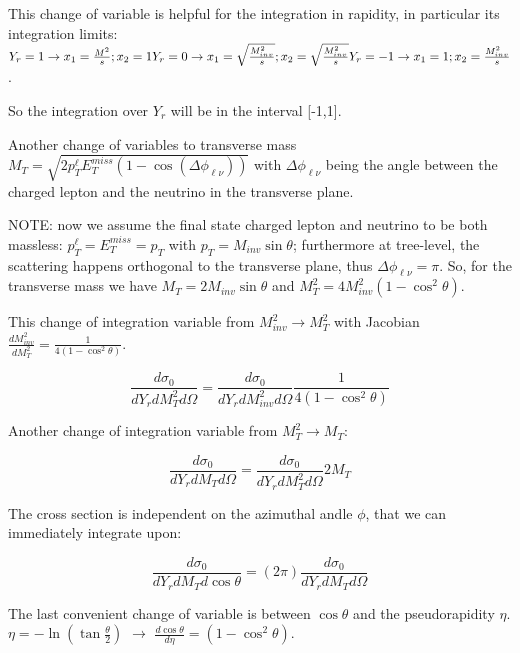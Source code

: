 \documentclass{article}
\begin{document}
This change of variable is helpful for the integration in rapidity, in particular its integration limits: \\
$Y_r = 1 \to x_1 = \frac{M^2}{s}; x_2 = 1\\
Y_r = 0 \to x_1 = \sqrt{\frac{M_{inv}^2}{s}}; x_2 = \sqrt{\frac{M_{inv}^2}{s}}\\
Y_r = -1 \to x_1=1; x_2= \frac{M_{inv}^2}{s}$.

So the integration over $Y_r$ will be in the interval [-1,1].

Another change of variables to transverse mass $M_T=\sqrt{2p_T^{\ell} E_T^{miss} \left(1-\cos\left(\Delta \phi _{\ell \nu}\right)\right)}$ with $\Delta \phi _{\ell \nu }$ being the angle between the charged lepton and the neutrino in the transverse plane.

NOTE: now we assume the final state charged lepton and neutrino to be both massless: $p_T^{\ell} = E_T^{miss} = p_T$ with $p_T = M_{inv}\sin\theta$; furthermore at tree-level, the scattering happens orthogonal to the transverse plane, thus $\Delta \phi _{\ell \nu} = \pi$.
So, for the transverse mass we have $M_T =2 M_{inv}\sin\theta$ and $M_T^2= 4 M_{inv}^2 \left(1-\cos^2\theta \right)$.

This change of integration variable from $M_{inv}^2\to M_T^2$ with Jacobian $\frac{dM_{inv}^2}{dM_T^2}=\frac{1}{4\left(1-\cos^2\theta \right)}$.

\begin{equation}
 \frac{d\sigma_0}{dY_r dM_T^2 d\Omega} = \frac{d\sigma_0}{dY_r dM_{inv}^2 d\Omega}\frac{1}{4\left(1-\cos^2\theta \right)}
\end{equation}

Another change of integration variable from $M_T^2 \to M_T$:

\begin{equation}
 \frac{d\sigma_0}{dY_r dM_T d\Omega} = \frac{d\sigma_0}{dY_r dM_T^2 d\Omega} 2 M_T
\end{equation}

The cross section is independent on the azimuthal andle $\phi$, that we can immediately integrate upon:

\begin{equation}
 \frac{d\sigma_0}{dY_r dM_T d\cos\theta} = (2\pi)\frac{d\sigma_0}{dY_r dM_T d\Omega}
\end{equation}

The last convenient change of variable is between $\cos\theta$ and the pseudorapidity $\eta$.\\
$\eta = -\ln\left(\tan\frac{\theta}{2}\right)$ $\longrightarrow$ $\frac{d\cos\theta}{d\eta} = (1 - \cos^2\theta)$.
\end{document}
